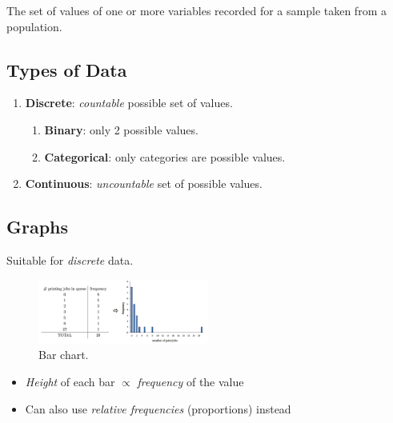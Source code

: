 \begin{definition}[Data]
    The set of values of one or more variables recorded for a sample taken from a population.
\end{definition}

\subsection{Types of Data}

\begin{enumerate}
    \item \textbf{Discrete}: \textit{countable} possible set of values.
    \begin{enumerate}
        \item \textbf{Binary}: only 2 possible values.
        \item \textbf{Categorical}: only categories are possible values.
    \end{enumerate}
    
    \item \textbf{Continuous}: \textit{uncountable} set of possible values.
\end{enumerate}

\subsection{Graphs}



